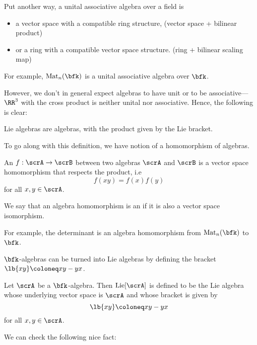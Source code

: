 \documentclass{article}
\DeclarePairedDelimiter\lb\lbrack\rbrack
\DeclareMathOperator{\Mat}{Mat}
\DeclareMathOperator{\Lie}{Lie}
\begin{document}
Put another way, a unital associative algebra over a field is 
\begin{itemize}
    \item 
        a vector space with a compatible ring structure, (vector space + bilinear product)
    \item 
        or a ring with a compatible vector space structure.
        (ring + bilinear scaling map)
\end{itemize}
For example, $\Mat_n(\bfk)$ is a unital associative algebra over $\bfk$.

However, we don't in general expect algebras to have unit or to be associative--- $\RR^3$ with the cross product is neither unital nor associative.
Hence, the following is clear:

\begin{proposition}
    Lie algebras are algebras, with the product given by the Lie bracket.
\end{proposition}

To go along with this definition, we have notion of a homomorphism of algebras.

\begin{definition}
    An  $f: \scrA \to \scrB$ between two algebras $\scrA$ and $\scrB$ is a vector space homomorphism that respects the product, i.e
    \[
        f(xy) 
        = 
        f(x)f(y)
    \]
    for all $x, y \in \scrA$.

    We say that an algebra homomorphism is an  if it is also a vector space isomorphism.
\end{definition}

For example, the determinant is an algebra homomorphism from $\Mat_n(\bfk)$ to $\bfk$.

$\bfk$-algebras can be turned into Lie algebras by defining the bracket $\lb{xy} \coloneq xy - yx$.

\begin{definition}
    Let $\scrA$ be a $\bfk$-algebra.
    Then $\Lie[\scrA]$ is defined to be the Lie algebra whose underlying vector space is $\scrA$ and whose bracket is given by
    \[
        \lb{xy}
        \coloneq
        xy - yx
    \]
    for all $x, y \in \scrA$.
\end{definition}

We can check the following nice fact: 
\end{document}
